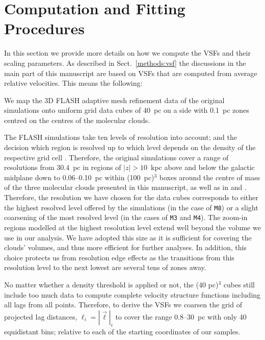 \section{Computation and Fitting Procedures}\label{appFitting}

In this section we provide more details on how we compute the VSFs and their scaling parameters.
As described in Sect.~\ref{methods:vsf} the discussions in the main part of this manuscript are based on VSFs that are computed from average relative velocities. 
This means the following:

We map the 3D FLASH adaptive mesh refinement data of the original simulations  onto uniform grid data cubes of 40~pc on a side with 0.1~pc zones centred on the centres of the molecular clouds. 

The FLASH simulations take ten levels of resolution into account; and the decision which region is resolved up to which level depends on the density of the respective grid cell .
Therefore, the original simulations cover a range of resolutions from 30.4~pc in regions of $|z| > 10$~kpc above and below the galactic midplane down to 0.06--0.10~pc within (100~pc)$^3$ boxes around the centre of mass of the three molecular clouds presented in this manuscript, as well as in  and . 
Therefore, the resolution we have chosen for the data cubes corresponds to either the highest resolved level offered by the simulations (in the case of \texttt{M8}) or a slight coarsening of the most resolved level (in the cases of \texttt{M3} and \texttt{M4}).
The zoom-in regions modelled at the highest resolution level extend well beyond the volume we use in our analysis.
We have adopted this size as it is sufficient for covering the clouds' volumes, and thus more efficient for further analyses. In addition, this choice protects us from resolution edge effects as the transitions from this resolution level to the next lowest are several tens of zones away. 

No matter whether a density threshold is applied or not, the (40 pc)$^3$ cubes still include too much data to compute complete velocity structure functions including all lags from all points.
Therefore, to derive the VSFs we coarsen the grid of projected lag distances, $\ell_i = |\vec{\ell}|_i$ to cover the range 0.8--30~pc with only 40 equidistant bins; relative to each of the starting coordinates of our samples. 

